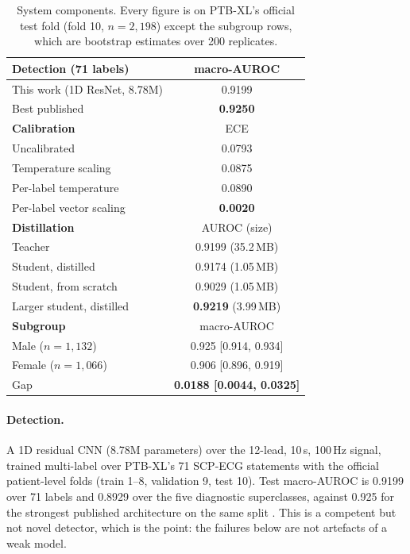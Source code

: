 \documentclass[pmlr,twocolumn,10pt]{jmlr}
\begin{document}
\begin{table}[t]
\centering
\caption{System components. Every figure is on PTB-XL's official test fold (fold 10,
$n=2{,}198$) except the subgroup rows, which are bootstrap estimates over 200 replicates.}
\label{tab:system}
\small
\begin{tabular}{lc}
\toprule
\textbf{Detection} (71 labels) & macro-AUROC \\
\midrule
This work (1D ResNet, 8.78M) & 0.9199 \\
Best published \citep{strodthoff2021deep} & \textbf{0.9250} \\
\midrule
\textbf{Calibration} & ECE \\
\midrule
Uncalibrated & 0.0793 \\
Temperature scaling & 0.0875 \\
Per-label temperature & 0.0890 \\
Per-label vector scaling & \textbf{0.0020} \\
\midrule
\textbf{Distillation} & AUROC (size) \\
\midrule
Teacher & 0.9199 (35.2\,MB) \\
Student, distilled & 0.9174 (1.05\,MB) \\
Student, from scratch & 0.9029 (1.05\,MB) \\
Larger student, distilled & \textbf{0.9219} (3.99\,MB) \\
\midrule
\textbf{Subgroup} & macro-AUROC \\
\midrule
Male ($n=1{,}132$)   & 0.925 [0.914, 0.934] \\
Female ($n=1{,}066$) & 0.906 [0.896, 0.919] \\
Gap & \textbf{0.0188 [0.0044, 0.0325]} \\
\bottomrule
\end{tabular}
\end{table}

\paragraph{Detection.} A 1D residual CNN (8.78M parameters) over the 12-lead, 10\,s, 100\,Hz
signal, trained multi-label over PTB-XL's 71 SCP-ECG statements with the official
patient-level folds (train 1--8, validation 9, test 10). Test macro-AUROC is 0.9199 over 71
labels and 0.8929 over the five diagnostic superclasses, against 0.925 for the strongest
published architecture on the same split \citep{strodthoff2021deep}. This is a competent but
not novel detector, which is the point: the failures below are not artefacts of a weak model.
\end{document}
